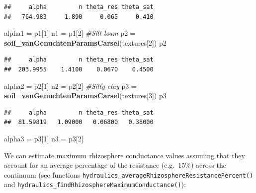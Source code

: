\documentclass[]{book}
\newenvironment{Shaded}{\begin{snugshade}}{\end{snugshade}}
\newcommand{\KeywordTok}[1]{\textcolor[rgb]{0.13,0.29,0.53}{\textbf{#1}}}
\newcommand{\DecValTok}[1]{\textcolor[rgb]{0.00,0.00,0.81}{#1}}
\newcommand{\StringTok}[1]{\textcolor[rgb]{0.31,0.60,0.02}{#1}}
\newcommand{\CommentTok}[1]{\textcolor[rgb]{0.56,0.35,0.01}{\textit{#1}}}
\newcommand{\NormalTok}[1]{#1}
\begin{document}
\begin{verbatim}
##     alpha         n theta_res theta_sat 
##   764.983     1.890     0.065     0.410
\end{verbatim}

\begin{Shaded}
\begin{Highlighting}[]
\NormalTok{alpha1 =}\StringTok{ }\NormalTok{p1[}\DecValTok{1}\NormalTok{]  }
\NormalTok{n1 =}\StringTok{ }\NormalTok{p1[}\DecValTok{2}\NormalTok{]}
\CommentTok{#Silt loam}
\NormalTok{p2 =}\StringTok{ }\KeywordTok{soil_vanGenuchtenParamsCarsel}\NormalTok{(textures[}\DecValTok{2}\NormalTok{])}
\NormalTok{p2}
\end{Highlighting}
\end{Shaded}

\begin{verbatim}
##     alpha         n theta_res theta_sat 
##  203.9955    1.4100    0.0670    0.4500
\end{verbatim}

\begin{Shaded}
\begin{Highlighting}[]
\NormalTok{alpha2 =}\StringTok{  }\NormalTok{p2[}\DecValTok{1}\NormalTok{]}
\NormalTok{n2 =}\StringTok{ }\NormalTok{p2[}\DecValTok{2}\NormalTok{]}
\CommentTok{#Silty clay}
\NormalTok{p3 =}\StringTok{ }\KeywordTok{soil_vanGenuchtenParamsCarsel}\NormalTok{(textures[}\DecValTok{3}\NormalTok{])}
\NormalTok{p3}
\end{Highlighting}
\end{Shaded}

\begin{verbatim}
##     alpha         n theta_res theta_sat 
##  81.59819   1.09000   0.06800   0.38000
\end{verbatim}

\begin{Shaded}
\begin{Highlighting}[]
\NormalTok{alpha3 =}\StringTok{  }\NormalTok{p3[}\DecValTok{1}\NormalTok{]}
\NormalTok{n3 =}\StringTok{ }\NormalTok{p3[}\DecValTok{2}\NormalTok{]}
\end{Highlighting}
\end{Shaded}

We can estimate maximum rhizosphere conductance values assuming that
they account for an average percentage of the resistance (e.g.~15\%)
across the continuum (see functions
\texttt{hydraulics\_averageRhizosphereResistancePercent()} and
\texttt{hydraulics\_findRhizosphereMaximumConductance()}):
\end{document}
